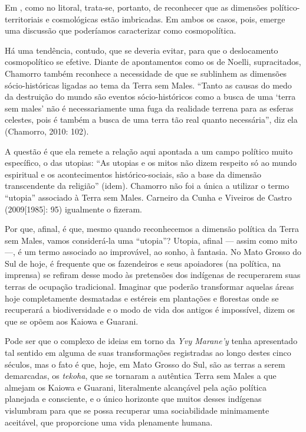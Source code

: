 Em , como no litoral, trata-se, portanto, de reconhecer que as
dimensões político- territoriais e cosmológicas estão imbricadas. Em
ambos os casos, pois, emerge uma discussão que poderíamos caracterizar
como cosmopolítica.

Há uma tendência, contudo, que se deveria evitar, para que o
deslocamento cosmopolítico se efetive. Diante de apontamentos como os
de Noelli, supracitados, Chamorro também reconhece a necessidade de que
se sublinhem as dimensões sócio-históricas ligadas ao tema da Terra sem
Males. ``Tanto as causas do medo da destruição do mundo são eventos
sócio-históricos como a busca de uma ‘terra sem males’ não é
necessariamente uma fuga da realidade terrena para as esferas celestes,
pois é também a busca de uma terra tão real quanto necessária'', diz ela
(Chamorro, 2010: 102). 

A questão é que ela remete a relação aqui apontada a um campo político
muito específico, o das utopias: ``As utopias e os mitos não dizem
respeito só ao mundo espiritual e os acontecimentos histórico-sociais,
são a base da dimensão transcendente da religião'' (idem). Chamorro não
foi a única a utilizar o termo ``utopia'' associado à Terra sem Males.
Carneiro da Cunha e Viveiros de Castro (2009[1985]: 95) igualmente o
fizeram. 

Por que, afinal, é que, mesmo quando reconhecemos a dimensão política da
Terra sem Males, vamos considerá-la uma ``utopia''? Utopia, afinal ---
assim como mito ---, é um termo associado ao improvável, ao sonho, à
fantasia. No Mato Grosso do Sul de hoje, é frequente que os fazendeiros
e seus apoiadores (na política, na imprensa) se refiram desse modo às
pretensões dos indígenas de recuperarem suas terras de ocupação
tradicional. Imaginar que poderão transformar aquelas áreas hoje
completamente desmatadas e estéreis em plantações e florestas onde se
recuperará a biodiversidade e o modo de vida dos antigos é impossível,
dizem os que se opõem aos Kaiowa e Guarani.

Pode ser que o complexo de ideias em torno da \emph{Yvy Marane’y} tenha
apresentado tal sentido em alguma de suas transformações registradas ao
longo destes cinco séculos, mas o fato é que, hoje, em Mato Grosso do
Sul, são as terras a serem demarcadas, os \emph{tekoha}, que se tornaram a
autêntica Terra sem Males a que almejam os Kaiowa e Guarani,
literalmente alcançável pela ação política planejada e consciente, e o
único horizonte que muitos desses indígenas vislumbram para que se
possa recuperar uma sociabilidade minimamente aceitável, que
proporcione uma vida plenamente humana.

